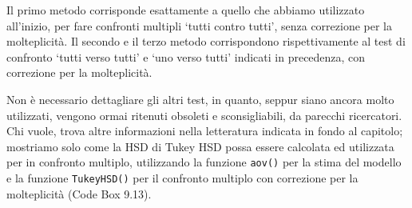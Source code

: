 \documentclass[
  12pt,
]{book}
\newenvironment{Shaded}{\begin{snugshade}}{\end{snugshade}}
\newcommand{\AttributeTok}[1]{\textcolor[rgb]{0.77,0.63,0.00}{#1}}
\newcommand{\CommentTok}[1]{\textcolor[rgb]{0.56,0.35,0.01}{\textit{#1}}}
\newcommand{\DocumentationTok}[1]{\textcolor[rgb]{0.56,0.35,0.01}{\textbf{\textit{#1}}}}
\newcommand{\FunctionTok}[1]{\textcolor[rgb]{0.00,0.00,0.00}{#1}}
\newcommand{\NormalTok}[1]{#1}
\newcommand{\OtherTok}[1]{\textcolor[rgb]{0.56,0.35,0.01}{#1}}
\newcommand{\SpecialCharTok}[1]{\textcolor[rgb]{0.00,0.00,0.00}{#1}}
\begin{document}
Il primo metodo corrisponde esattamente a quello che abbiamo utilizzato all'inizio, per fare confronti multipli `tutti contro tutti', senza correzione per la molteplicità. Il secondo e il terzo metodo corrispondono rispettivamente al test di confronto `tutti verso tutti' e `uno verso tutti' indicati in precedenza, con correzione per la molteplicità.

Non è necessario dettagliare gli altri test, in quanto, seppur siano ancora molto utilizzati, vengono ormai ritenuti obsoleti e sconsigliabili, da parecchi ricercatori. Chi vuole, trova altre informazioni nella letteratura indicata in fondo al capitolo; mostriamo solo come la HSD di Tukey HSD possa essere calcolata ed utilizzata per in confronto multiplo, utilizzando la funzione \texttt{aov()} per la stima del modello e la funzione \texttt{TukeyHSD()} per il confronto multiplo con correzione per la molteplicità (Code Box 9.13).

\begin{Shaded}
\end{Shaded}
\end{document}
